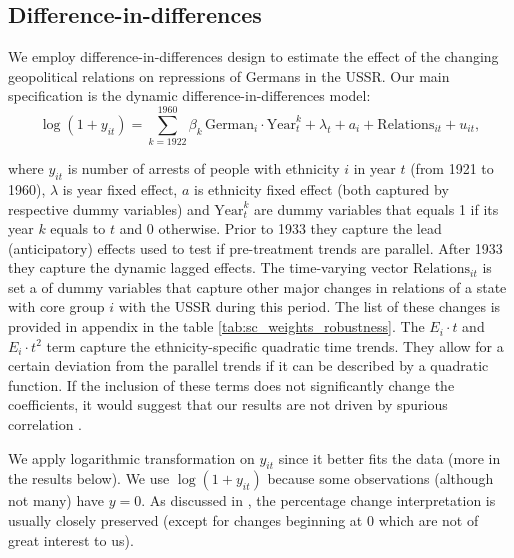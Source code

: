 \subsection{Difference-in-differences}
We employ difference-in-differences design to estimate the effect of the changing geopolitical relations on repressions of Germans in the USSR. 
Our main specification is the dynamic difference-in-differences model:
\begin{equation}
 \log\left(1 + y_{it}\right) = \sum_{k= 1922}^{1960} \beta_k \, \text{German}_{i} \cdot \text{Year}_{t}^k +  \lambda_t + a_i +  \text{Relations}_{it}   + u_{it},
 \label{eq:dynamic_did}
\end{equation}

where $y_{it}$ is number of arrests of people with ethnicity $i$ in year $t$ (from 1921 to 1960), $\lambda$ is year fixed effect, $a$ is ethnicity fixed effect (both captured by respective dummy variables) and  $\text{Year}_{t}^k$ are dummy variables that equals 1 if its year $k$ equals to $t$ and 0 otherwise.
Prior to  1933 they capture the lead (anticipatory) effects  used to test if pre-treatment trends are parallel. After 1933 they capture the dynamic lagged effects.
The time-varying vector $\text{Relations}_{it}$ is set a of dummy variables that capture other major changes in relations of a state with core group $i$ with the USSR during this period. 
The list of these changes is provided in appendix in the table \ref{tab:sc_weights_robustness}.
The $ E_i \cdot t$ and $ E_i \cdot t^2$  term capture the ethnicity-specific quadratic time trends. 
They allow for a certain  deviation from the parallel trends if it can be described by a quadratic function. 
If the inclusion of these terms does not  significantly  change the coefficients, it would suggest that our results are not driven by spurious correlation \citep{angrist_mostly_2009}.

 We apply logarithmic transformation on $y_{it}$ since it better fits the data (more in the results below).  We use $\log\left(1 + y_{it}\right)$ because some observations (although not many) have $y = 0$. As discussed in \citet[p. 193]{wooldridge_introductory_2015},  the percentage change interpretation is usually  closely preserved (except for changes beginning at 0 which are not of great interest to us).   

